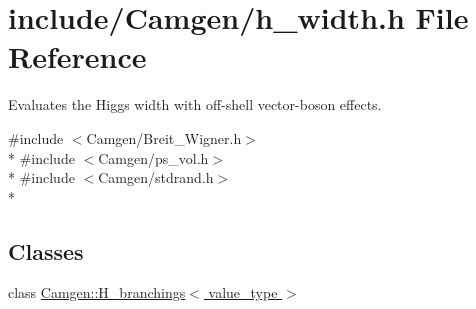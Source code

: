\hypertarget{a00656}{}\section{include/\+Camgen/h\+\_\+width.h File Reference}
\label{a00656}


Evaluates the Higgs width with off-\/shell vector-\/boson effects.  


{\ttfamily \#include $<$Camgen/\+Breit\+\_\+\+Wigner.\+h$>$}\\*
{\ttfamily \#include $<$Camgen/ps\+\_\+vol.\+h$>$}\\*
{\ttfamily \#include $<$Camgen/stdrand.\+h$>$}\\*
\subsection*{Classes}
\begin{DoxyCompactItemize}
\item 
class \hyperlink{a00257}{Camgen\+::\+H\+\_\+branchings$<$ value\+\_\+type $>$}
\end{DoxyCompactItemize}
